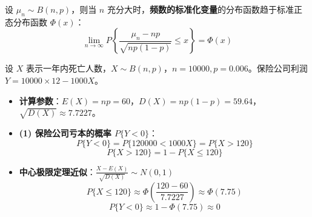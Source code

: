 \begin{theorem}
设 $\mu_n \sim B(n, p)$，则当 $n$ 充分大时，\textbf{频数的标准化变量}的分布函数趋于标准正态分布函数 $\Phi(x)$：
\begin{equation}
	\lim_{n \to \infty} P\left\{\frac{\mu_n - n p}{\sqrt{n p (1-p)}} \le x\right\} = \Phi(x)
	\label{eq:第五章:棣莫弗}
\end{equation}
\end{theorem}

\begin{example}[保险公司亏本概率]
设 $X$ 表示一年内死亡人数，$X \sim B(n, p)$，$n = 10000, p = 0.006$。保险公司利润 $Y = 10000 \times 12 - 1000 X$。
\begin{itemize}
	\item \textbf{计算参数}：$E(X) = n p = 60$，$D(X) = n p (1-p) = 59.64$，$\sqrt{D(X)} \approx 7.7227$。
	\item \textbf{(1) 保险公司亏本的概率 $P\{Y < 0\}$}：
	\begin{equation}
		P\{Y < 0\} = P\{120000 < 1000 X\} = P\{X > 120\}
		\label{eq:第五章:例1}
	\end{equation}
	\begin{equation}
		P\{X > 120\} = 1 - P\{X \le 120\}
		\label{eq:第五章:例2}
	\end{equation}
	\item \textbf{中心极限定理近似}：$\frac{X - E(X)}{\sqrt{D(X)}} \sim N(0, 1)$
	\begin{equation}
		P\{X \le 120\} \approx \Phi\left(\frac{120 - 60}{7.7227}\right) \approx \Phi(7.75)
		\label{eq:第五章:例3}
	\end{equation}
	\begin{equation}
		P\{Y < 0\} \approx 1 - \Phi(7.75) \approx 0
		\label{eq:第五章:例4}
	\end{equation}
\end{itemize}
\end{example}
